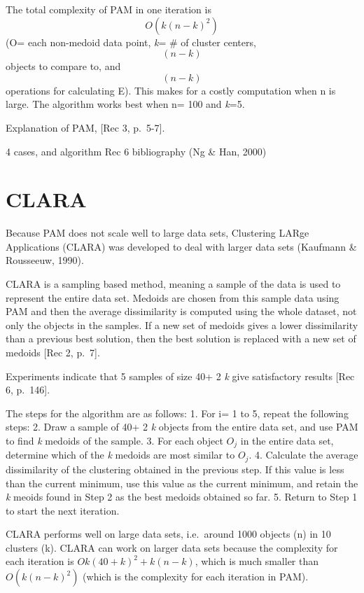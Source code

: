 \documentclass[12pt,twoside]{amherstthesis}
\begin{document}
  The total complexity of PAM in one iteration is \[O(k(n-k)^2)\] (O= each
  non-medoid data point, \emph{k}= \# of cluster centers, \[(n-k)\]
  objects to compare to, and \[(n-k)\] operations for calculating E). This
  makes for a costly computation when n is large. The algorithm works best
  when n= 100 and \emph{k}=5.
  
  Explanation of PAM, {[}Rec 3, p.~5-7{]}.
  
  4 cases, and algorithm Rec 6 bibliography (Ng \& Han, 2000)
  
  \section{CLARA}\label{clara}
  
  Because PAM does not scale well to large data sets, Clustering LARge
  Applications (CLARA) was developed to deal with larger data sets
  (Kaufmann \& Rousseeuw, 1990).
  
  CLARA is a sampling based method, meaning a sample of the data is used
  to represent the entire data set. Medoids are chosen from this sample
  data using PAM and then the average dissimilarity is computed using the
  whole dataset, not only the objects in the samples. If a new set of
  medoids gives a lower dissimilarity than a previous best solution, then
  the best solution is replaced with a new set of medoids {[}Rec 2,
  p.~7{]}.
  
  Experiments indicate that 5 samples of size 40+ 2 \emph{k} give
  satisfactory results {[}Rec 6, p.~146{]}.
  
  The steps for the algorithm are as follows: 1. For i= 1 to 5, repeat the
  following steps: 2. Draw a sample of 40+ 2 \emph{k} objects from the
  entire data set, and use PAM to find \emph{k} medoids of the sample. 3.
  For each object \(O_j\) in the entire data set, determine which of the
  \emph{k} medoids are most similar to \(O_j\). 4. Calculate the average
  dissimilarity of the clustering obtained in the previous step. If this
  value is less than the current minimum, use this value as the current
  minimum, and retain the \emph{k} meoids found in Step 2 as the best
  medoids obtained so far. 5. Return to Step 1 to start the next
  iteration.
  
  CLARA performs well on large data sets, i.e.~around 1000 objects (n) in
  10 clusters (k). CLARA can work on larger data sets because the
  complexity for each iteration is \(O{k(40 + k)^2 + k(n-k)}\), which is
  much smaller than \(O(k(n-k)^2)\) (which is the complexity for each
  iteration in PAM).
  
\end{document}
